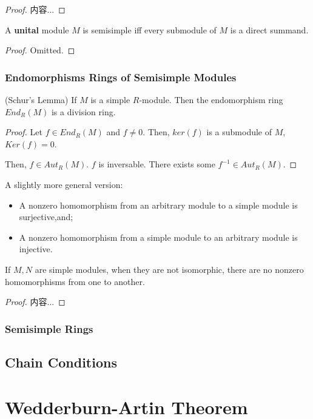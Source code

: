 \documentclass[Total.tex]{subfiles}
\begin{document}
	\begin{proof}
		内容...
	\end{proof}
	
	\begin{corollary}
		A \textbf{unital} module $M$ is semisimple iff every submodule of $M$ is a direct summand.
	\end{corollary}
	
	\begin{proof}
		Omitted.
	\end{proof}
	\subsubsection{Endomorphisms Rings of Semisimple Modules}
	
	\begin{theorem}
		(Schur's Lemma) If $M$ is a simple $R$-module. Then the endomorphism ring $End_R(M)$ is a division ring.	\label{Schurs-Lemma-for-Endomorphism-of-Simple-Modules}
	\end{theorem}
	
	\begin{proof}
		Let $f\in End_R(M)$ and $f\not=0$. Then, $ker(f)$ is a submodule of $M$, $Ker(f)=0$. 
		
		Then, $f\in Aut_R(M)$. $f$ is inversable. There exists some $f^{-1}\in Aut_R(M)$.
	\end{proof}
	
	A slightly more general version: 
	
	\begin{itemize}
		\item A nonzero homomorphism from an arbitrary module to a simple module is surjective,and;
		
		\item  A nonzero
		homomorphism from a simple module to an arbitrary module is injective.
	\end{itemize}
	
	\begin{lemma}
		If $M,N$ are simple modules, when they are not isomorphic, there are no nonzero homomorphisms from one to another.
	\end{lemma}
	
	\begin{proof}
		内容...
	\end{proof}
	
	\subsubsection{Semisimple Rings}
	
	\subsection{Chain Conditions}
	
	\section{Wedderburn-Artin Theorem}
\end{document}
